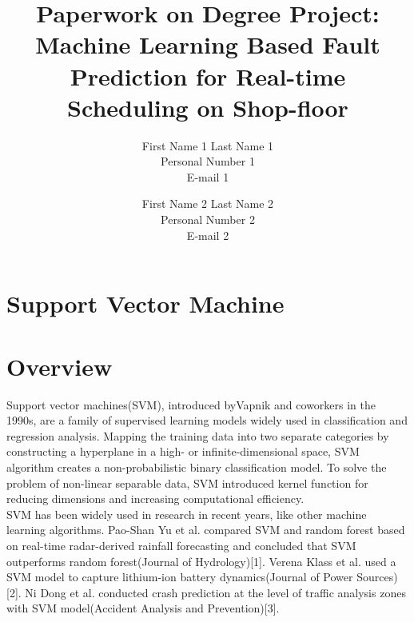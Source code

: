 \documentclass[a4paper,12pt,oneside,onecolumn]{article} %
\begin{document}

\title{Paperwork on Degree Project: Machine Learning Based Fault Prediction for Real-time Scheduling on Shop-floor}
\author{
  First Name 1 Last Name 1 \\ Personal Number 1 \\ E-mail 1 
  \and 
  First Name 2 Last Name 2 \\ Personal Number 2 \\ E-mail 2
  }

\maketitle                     %





\section*{Support Vector Machine}

\section*{Overview}
Support vector machines(SVM), introduced byVapnik and coworkers in the 1990s, are a family of supervised learning models widely used in classification and regression analysis. Mapping the training data into two separate categories by constructing a hyperplane in a high- or infinite-dimensional space, SVM algorithm creates a non-probabilistic binary classification model. To solve the problem of non-linear separable data, SVM introduced kernel function for reducing dimensions and increasing computational efficiency. \\
SVM has been widely used in research in recent years, like other machine learning algorithms. Pao-Shan Yu et al. compared SVM and random forest based on real-time radar-derived rainfall forecasting and concluded that SVM outperforms random forest(Journal of Hydrology)[1]. Verena Klass et al. used a SVM model to capture lithium-ion battery dynamics(Journal of Power Sources)[2]. Ni Dong et al. conducted crash prediction at the level of traffic
analysis zones with SVM model(Accident Analysis and Prevention)[3].
\end{document}
